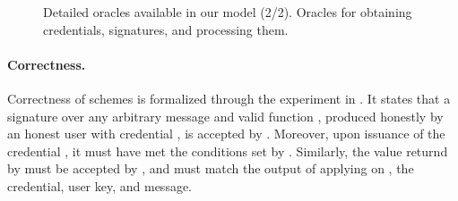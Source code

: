{\begin{figure*}[htp!]
{\begin{minipage}[t]{.5\textwidth}

        
      \end{minipage}
      
    }

    \caption{Detailed oracles available in our model (2/2). Oracles for
      obtaining credentials, signatures, and processing them.}
    \label{fig:oracles2}
  \end{figure*}
}

\paragraph{Correctness.} %
Correctness of \UAS schemes is formalized through the experiment in
. It states that a signature over any arbitrary message
and valid function \feval {},
produced honestly by an honest user \uid with credential \cid, is accepted by
\Verify. Moreover, upon issuance of the credential \cid, it must have met the
conditions set by \fissue. Similarly, the value returnd by \Inspect must be
accepted by \Judge, and must match the output of applying \finsp on \feval, the
credential, user key, and message.

